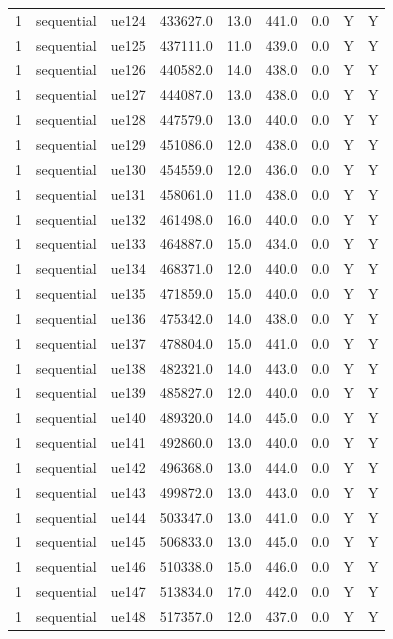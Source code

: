 \begin{table}[ht]
\begin{tabular}{|c|c|c|c|c|c|c|c|c|}
1 & sequential & ue124 & 433627.0 & 13.0 & 441.0 & 0.0 & Y & Y \\
1 & sequential & ue125 & 437111.0 & 11.0 & 439.0 & 0.0 & Y & Y \\
1 & sequential & ue126 & 440582.0 & 14.0 & 438.0 & 0.0 & Y & Y \\
1 & sequential & ue127 & 444087.0 & 13.0 & 438.0 & 0.0 & Y & Y \\
1 & sequential & ue128 & 447579.0 & 13.0 & 440.0 & 0.0 & Y & Y \\
1 & sequential & ue129 & 451086.0 & 12.0 & 438.0 & 0.0 & Y & Y \\
1 & sequential & ue130 & 454559.0 & 12.0 & 436.0 & 0.0 & Y & Y \\
1 & sequential & ue131 & 458061.0 & 11.0 & 438.0 & 0.0 & Y & Y \\
1 & sequential & ue132 & 461498.0 & 16.0 & 440.0 & 0.0 & Y & Y \\
1 & sequential & ue133 & 464887.0 & 15.0 & 434.0 & 0.0 & Y & Y \\
1 & sequential & ue134 & 468371.0 & 12.0 & 440.0 & 0.0 & Y & Y \\
1 & sequential & ue135 & 471859.0 & 15.0 & 440.0 & 0.0 & Y & Y \\
1 & sequential & ue136 & 475342.0 & 14.0 & 438.0 & 0.0 & Y & Y \\
1 & sequential & ue137 & 478804.0 & 15.0 & 441.0 & 0.0 & Y & Y \\
1 & sequential & ue138 & 482321.0 & 14.0 & 443.0 & 0.0 & Y & Y \\
1 & sequential & ue139 & 485827.0 & 12.0 & 440.0 & 0.0 & Y & Y \\
1 & sequential & ue140 & 489320.0 & 14.0 & 445.0 & 0.0 & Y & Y \\
1 & sequential & ue141 & 492860.0 & 13.0 & 440.0 & 0.0 & Y & Y \\
1 & sequential & ue142 & 496368.0 & 13.0 & 444.0 & 0.0 & Y & Y \\
1 & sequential & ue143 & 499872.0 & 13.0 & 443.0 & 0.0 & Y & Y \\
1 & sequential & ue144 & 503347.0 & 13.0 & 441.0 & 0.0 & Y & Y \\
1 & sequential & ue145 & 506833.0 & 13.0 & 445.0 & 0.0 & Y & Y \\
1 & sequential & ue146 & 510338.0 & 15.0 & 446.0 & 0.0 & Y & Y \\
1 & sequential & ue147 & 513834.0 & 17.0 & 442.0 & 0.0 & Y & Y \\
1 & sequential & ue148 & 517357.0 & 12.0 & 437.0 & 0.0 & Y & Y \\

\end{tabular}
\end{table}
